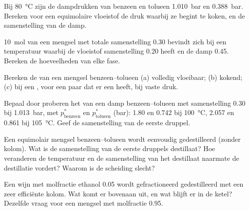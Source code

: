 \begin{exercise}[$\star$]\label{exo:b2:liquid-vapour-diagrams:2}
Bij \qty{80}{\degreeCelsius} zijn de dampdrukken van benzeen en tolueen
\qty{1.010}{bar} en \qty{0.388}{bar}. Bereken voor een equimolaire vloeistof de
druk waarbij ze begint te koken, en de samenstelling van de damp.
\end{exercise}

\begin{exercise}[$\star$]\label{exo:b2:liquid-vapour-diagrams:3}
\qty{10}{mol} van een mengsel met totale samenstelling 0.30 bevindt zich bij een temperatuur
waarbij de vloeistof samenstelling 0.20 heeft en de damp 0.45. Bereken de hoeveelheden
van elke fase.
\end{exercise}

\begin{exercise}[$\star$]\label{exo:b2:liquid-vapour-diagrams:4}
Bereken de  van een mengsel benzeen--tolueen (a) volledig vloeibaar; (b)
kokend; (c) bij een , voor een paar dat er een heeft, bij vaste druk.
\end{exercise}

\begin{exercise}[$\star\star$]\label{exo:b2:liquid-vapour-diagrams:5}
Bepaal door proberen het  van een damp benzeen--tolueen met samenstelling 0.30 bij
\qty{1.013}{bar}, met $p^*_{\text{benzeen}}$ en $p^*_{\text{tolueen}}$
(\unit{bar}): 1.80 en 0.742 bij \qty{100}{\degreeCelsius}, 2.057 en 0.861 bij
\qty{105}{\degreeCelsius}. Geef de samenstelling van de eerste druppel.
\end{exercise}

\begin{exercise}[$\star\star$]\label{exo:b2:liquid-vapour-diagrams:6}
Een equimolair mengsel benzeen--tolueen wordt eenvoudig gedestilleerd (zonder kolom). Wat is
de samenstelling van de eerste druppels destillaat? Hoe veranderen de temperatuur en
de samenstelling van het destillaat naarmate de destillatie vordert? Waarom is
de scheiding slecht?
\end{exercise}

\begin{exercise}[$\star\star$]\label{exo:b2:liquid-vapour-diagrams:7}
Een wijn met molfractie ethanol 0.05 wordt gefractioneerd gedestilleerd met een zeer
efficiënte kolom. Wat komt er bovenaan uit, en wat blijft er in de ketel?
Dezelfde vraag voor een mengsel met molfractie 0.95.
\end{exercise}

